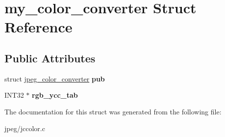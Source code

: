 \hypertarget{structmy__color__converter}{}\section{my\+\_\+color\+\_\+converter Struct Reference}
\label{structmy__color__converter}
\subsection*{Public Attributes}
\begin{DoxyCompactItemize}
\item 
struct \hyperlink{structjpeg__color__converter}{jpeg\+\_\+color\+\_\+converter} {\bfseries pub}\hypertarget{structmy__color__converter_a6dbeef88bd91b6e62d940ad245474768}{}\label{structmy__color__converter_a6dbeef88bd91b6e62d940ad245474768}

\item 
I\+N\+T32 $\ast$ {\bfseries rgb\+\_\+ycc\+\_\+tab}\hypertarget{structmy__color__converter_a783865e631ba6e4e903fcfad6625ec2f}{}\label{structmy__color__converter_a783865e631ba6e4e903fcfad6625ec2f}

\end{DoxyCompactItemize}


The documentation for this struct was generated from the following file\+:\begin{DoxyCompactItemize}
\item 
jpeg/jccolor.\+c\end{DoxyCompactItemize}
